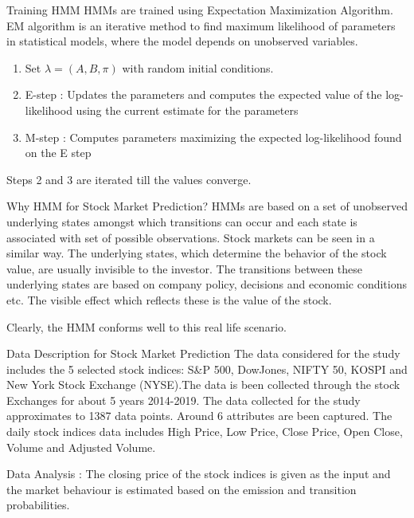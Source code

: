 \documentclass{beamer}
\begin{document}
\begin{frame}{Training HMM}
    HMMs are trained using Expectation Maximization Algorithm. EM algorithm is an iterative method to find maximum likelihood of parameters in statistical models, where the model depends on unobserved variables.
    \begin{enumerate}
        \item Set $\lambda =(A,B,\pi )$ with random initial conditions.
        \item E-step : Updates the parameters and computes the expected value of the log-likelihood using the current estimate for the parameters
        \item M-step : Computes parameters maximizing the expected log-likelihood found on the E step
    \end{enumerate}
    Steps 2 and 3 are iterated till the values converge.
\end{frame}
\begin{frame}{Why HMM for Stock Market Prediction?}
    HMMs are based on a set of unobserved underlying states amongst which transitions can occur and each state is associated with set of possible observations. Stock markets can be seen in a similar way. The underlying states, which determine the behavior of the stock value, are usually invisible to the investor. The transitions between these underlying states are based on company policy, decisions and economic conditions etc. The visible effect which reflects these is the value of the stock.
    
    Clearly, the HMM conforms well to this real life scenario.
\end{frame}
\begin{frame}{Data Description for Stock Market Prediction}
    The data considered for the study includes the 5 selected stock indices: S&P 500, DowJones, NIFTY 50, KOSPI and New York Stock Exchange (NYSE).The data is been collected through the stock Exchanges for about 5 years 2014-2019. The data collected for the study approximates to 1387 data points. Around 6 attributes are been captured. The daily stock indices data includes High Price, Low Price, Close Price, Open Close, Volume and Adjusted Volume. 
    
    Data Analysis : The closing price of the stock indices is given as the input and the market behaviour is estimated based on the emission and transition probabilities.
\end{frame}
\end{document}
